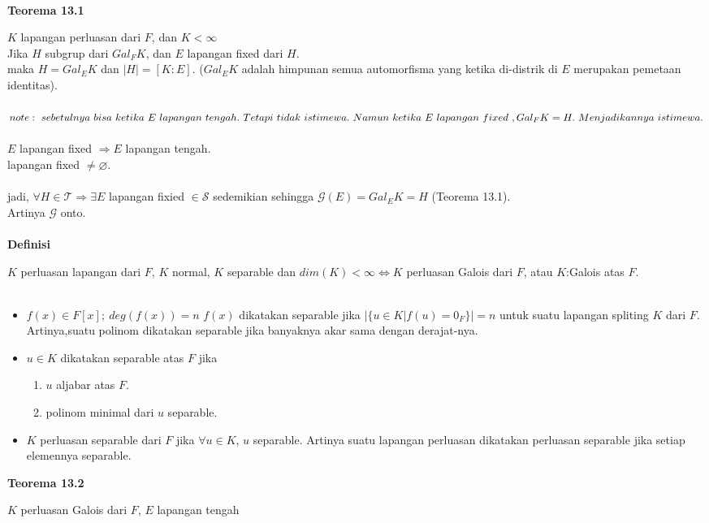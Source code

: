 \\ \textbf{Teorema 13.1}
	\par $K$ lapangan perluasan dari $F$, dan $K < \infty$\\
Jika $H$ subgrup dari $Gal_FK$, dan $E$ lapangan fixed dari $H$.\\
maka $H=Gal_EK$ dan $|H|=[K:E]$. ($Gal_EK$ adalah himpunan semua automorfisma yang ketika di-distrik di $E$ merupakan pemetaan identitas).\\ \\
$note:~sebetulnya~bisa~ketika~E~lapangan~tengah.~Tetapi~tidak~istimewa.\\~Namun~ketika~E~lapangan~fixed~, Gal_FK=H.~Menjadikannya~istimewa.$\\ \\
$E$ lapangan fixed $\Rightarrow E$ lapangan tengah.\\
lapangan fixed $\ne \varnothing$.\\ \\
jadi, $\forall H \in \mathcal{T} \Rightarrow \exists E$ lapangan fixied $\in \mathcal{S}$ sedemikian sehingga $\mathcal{G}(E)=Gal_EK=H$ (Teorema 13.1).\\
Artinya $\mathcal{G}$ onto.\\
\\ \textbf{Definisi}
	\par $K$ perluasan lapangan dari $F$, $K$ normal, $K$ separable dan $dim(K)<\infty \iff K$ perluasan Galois dari $F$, atau $K$:Galois atas $F$.\\ \\
\begin{itemize}
\item $f(x) \in F[x];~deg(f(x))=n$ $f(x)$ dikatakan separable jika $|\{u\in K|f(u)=0_F\}|=n$ untuk suatu lapangan spliting $K$ dari $F$. Artinya,suatu polinom dikatakan separable jika banyaknya akar sama dengan derajat-nya.
\item $u \in K$ dikatakan separable atas $F$ jika \begin{enumerate}
\item $u$ aljabar atas $F$.
\item polinom minimal dari $u$ separable.
\end{enumerate}
\item $K$ perluasan separable dari $F$ jika $\forall u \in K$, $u$ separable. Artinya suatu lapangan perluasan dikatakan perluasan separable jika setiap elemennya separable.
\end{itemize}
\textbf{Teorema 13.2}
	\par $K$ perluasan Galois dari $F$, $E$ lapangan tengah\\
